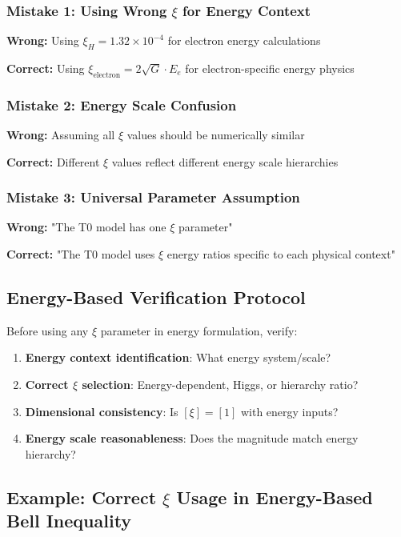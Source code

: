 \documentclass[12pt,a4paper]{article}
\begin{document}
\subsubsection{Mistake 1: Using Wrong $\xi$ for Energy Context}
\textbf{Wrong:} Using $\xi_H = 1.32 \times 10^{-4}$ for electron energy calculations

\textbf{Correct:} Using $\xi_{\text{electron}} = 2\sqrt{G} \cdot E_e$ for electron-specific energy physics

\subsubsection{Mistake 2: Energy Scale Confusion}
\textbf{Wrong:} Assuming all $\xi$ values should be numerically similar

\textbf{Correct:} Different $\xi$ values reflect different energy scale hierarchies

\subsubsection{Mistake 3: Universal Parameter Assumption}
\textbf{Wrong:} "The T0 model has one $\xi$ parameter"

\textbf{Correct:} "The T0 model uses $\xi$ energy ratios specific to each physical context"

\subsection{Energy-Based Verification Protocol}
\label{subsec:energy_verification_protocol}

Before using any $\xi$ parameter in energy formulation, verify:

\begin{enumerate}
	\item \textbf{Energy context identification}: What energy system/scale?
	\item \textbf{Correct $\xi$ selection}: Energy-dependent, Higgs, or hierarchy ratio?
	\item \textbf{Dimensional consistency}: Is $[\xi] = [1]$ with energy inputs?
	\item \textbf{Energy scale reasonableness}: Does the magnitude match energy hierarchy?
\end{enumerate}

\subsection{Example: Correct $\xi$ Usage in Energy-Based Bell Inequality}
\label{subsec:example_energy_bell}
\end{document}
